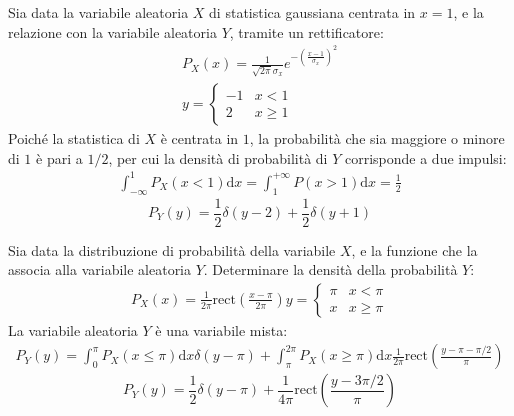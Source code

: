 \documentclass{article}
\newcommand{\rect}{\mbox{rect}}
\newcommand{\df}{\mathrm{d}}
\begin{document}
Sia data la variabile aleatoria $X$ di statistica gaussiana centrata in $x=1$, e la relazione con la variabile aleatoria $Y$, tramite un rettificatore:
\begin{gather*}
    P_X(x)=\displaystyle\frac{1}{\sqrt{2\pi}\sigma_x}e^{-\left(\frac{x-1}{\sigma_x}\right)^2}\\
    y=\begin{cases}
        -1&x< 1\\
        2&x\geq 1
    \end{cases}
\end{gather*}
Poiché la statistica di $X$ è centrata in $1$, la probabilità che sia maggiore o minore di $1$ è pari a $1/2$, per cui la densità di probabilità di 
$Y$ corrisponde a due impulsi:
\begin{gather*}
    \displaystyle\int_{-\infty}^1P_X(x<1)\df x=\int_{1}^{+\infty}P(x>1)\df x=\frac{1}{2}
\end{gather*}
\begin{equation}
    P_Y(y)=\displaystyle\frac{1}{2}\delta(y-2)+\frac{1}{2}\delta(y+1)
\end{equation}


Sia data la distribuzione di probabilità della variabile $X$, e la funzione che la associa alla variabile aleatoria $Y$. Determinare la densità della probabilità $Y$:
\begin{gather*}
    P_X(x)=\displaystyle\frac{1}{2\pi}\rect\left(\frac{x-\pi}{2\pi}\right)
    y=\begin{cases}
        \pi &x<\pi\\
        x &x\geq\pi
    \end{cases}
\end{gather*}
La variabile aleatoria $Y$ è una variabile mista:
\begin{gather*}
    P_Y(y)=\displaystyle\int_0^{\pi}P_X(x\leq\pi)\df x\delta(y-\pi)+\int_{\pi}^{2\pi}P_X(x\geq\pi)\df x \frac{1}{2\pi}\rect\left(\frac{y-\pi-\pi/2}{\pi}\right)
\end{gather*}
\begin{equation}
    P_Y(y)=\displaystyle\frac{1}{2}\delta(y-\pi)+\frac{1}{4\pi}\rect\left(\frac{y-3\pi/2}{\pi}\right)
\end{equation}
\end{document}
